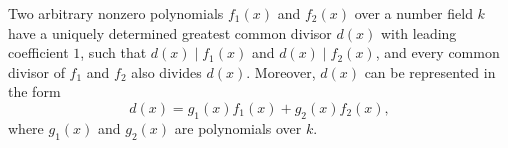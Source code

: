 Two arbitrary nonzero polynomials $f_1(x)$ and $f_2(x)$ over a number field $k$ have a uniquely determined greatest common divisor $d(x)$ with leading coefficient $1$, such that $d(x) \mid f_1(x)$ and $d(x) \mid f_2(x)$, and every common divisor of $f_1$ and $f_2$ also divides $d(x)$. Moreover, $d(x)$ can be represented in the form
$$d(x) = g_1(x) f_1(x) + g_2(x) f_2(x),$$
where $g_1(x)$ and $g_2(x)$ are polynomials over $k$.
